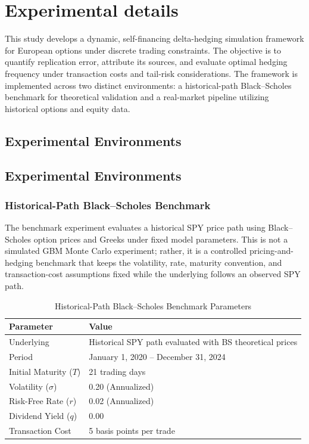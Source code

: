 \documentclass{article}
\begin{document}
\section{Experimental details}
This study develops a dynamic, self-financing delta-hedging simulation framework for European options under discrete trading constraints. The objective is to quantify replication error, attribute its sources, and evaluate optimal hedging frequency under transaction costs and tail-risk considerations. The framework is implemented across two distinct environments: a historical-path Black--Scholes benchmark for theoretical validation and a real-market pipeline utilizing historical options and equity data.

\subsection{Experimental Environments}
\subsection{Experimental Environments}

\subsubsection{Historical-Path Black--Scholes Benchmark}
The benchmark experiment evaluates a historical SPY price path using Black--Scholes option prices and Greeks under fixed model parameters. This is not a simulated GBM Monte Carlo experiment; rather, it is a controlled pricing-and-hedging benchmark that keeps the volatility, rate, maturity convention, and transaction-cost assumptions fixed while the underlying follows an observed SPY path.

\begin{table}[H]
\centering
\caption{Historical-Path Black--Scholes Benchmark Parameters}
\begin{tabular}{ll}
\hline
\textbf{Parameter} & \textbf{Value} \\
\hline
Underlying & Historical SPY path evaluated with BS theoretical prices \\
Period & January 1, 2020 -- December 31, 2024 \\
Initial Maturity ($T$) & 21 trading days \\
Volatility ($\sigma$) & 0.20 (Annualized) \\
Risk-Free Rate ($r$) & 0.02 (Annualized) \\
Dividend Yield ($q$) & 0.00 \\
Transaction Cost & 5 basis points per trade \\
\hline
\end{tabular}
\label{tab:baseline_params}
\end{table}
\end{document}
